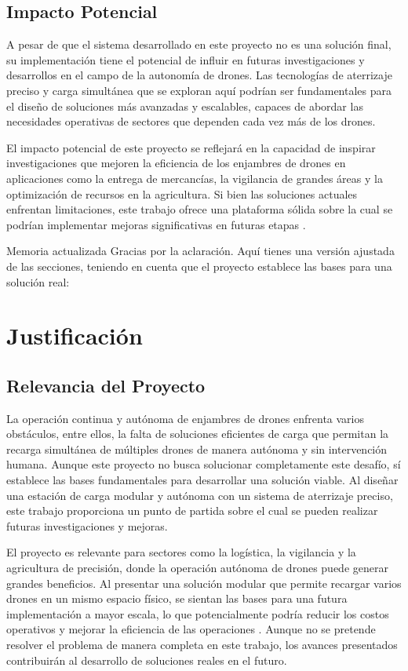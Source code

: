 \subsection{Impacto Potencial}

A pesar de que el sistema desarrollado en este proyecto no es una solución final, su implementación tiene el potencial de influir en futuras investigaciones y desarrollos en el campo de la autonomía de drones. Las tecnologías de aterrizaje preciso y carga simultánea que se exploran aquí podrían ser fundamentales para el diseño de soluciones más avanzadas y escalables, capaces de abordar las necesidades operativas de sectores que dependen cada vez más de los drones.

El impacto potencial de este proyecto se reflejará en la capacidad de inspirar investigaciones que mejoren la eficiencia de los enjambres de drones en aplicaciones como la entrega de mercancías, la vigilancia de grandes áreas y la optimización de recursos en la agricultura. Si bien las soluciones actuales enfrentan limitaciones, este trabajo ofrece una plataforma sólida sobre la cual se podrían implementar mejoras significativas en futuras etapas \cite{cite2}.


Memoria actualizada
Gracias por la aclaración. Aquí tienes una versión ajustada de las secciones, teniendo en cuenta que el proyecto establece las bases para una solución real:

\section{Justificación}

\subsection{Relevancia del Proyecto}

La operación continua y autónoma de enjambres de drones enfrenta varios obstáculos, entre ellos, la falta de soluciones eficientes de carga que permitan la recarga simultánea de múltiples drones de manera autónoma y sin intervención humana. Aunque este proyecto no busca solucionar completamente este desafío, sí establece las bases fundamentales para desarrollar una solución viable. Al diseñar una estación de carga modular y autónoma con un sistema de aterrizaje preciso, este trabajo proporciona un punto de partida sobre el cual se pueden realizar futuras investigaciones y mejoras.

El proyecto es relevante para sectores como la logística, la vigilancia y la agricultura de precisión, donde la operación autónoma de drones puede generar grandes beneficios. Al presentar una solución modular que permite recargar varios drones en un mismo espacio físico, se sientan las bases para una futura implementación a mayor escala, lo que potencialmente podría reducir los costos operativos y mejorar la eficiencia de las operaciones \cite{cite1}. Aunque no se pretende resolver el problema de manera completa en este trabajo, los avances presentados contribuirán al desarrollo de soluciones reales en el futuro.

